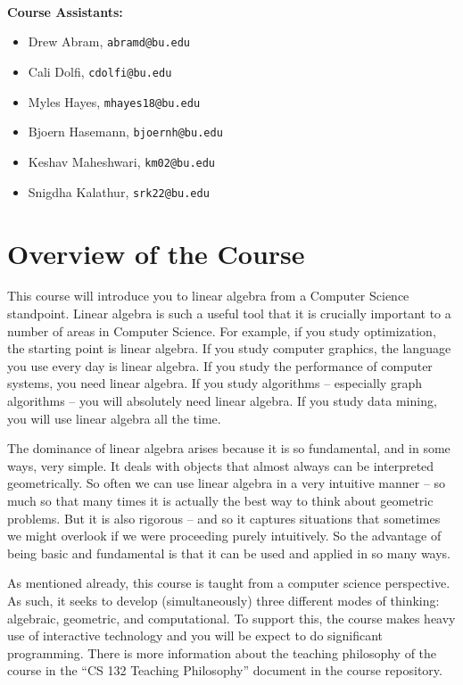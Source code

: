 \documentclass[11pt]{article}
\begin{document}
~\\~\\~\\
\textbf{Course Assistants:}  
\begin{itemize}
\item Drew Abram, \texttt{abramd@bu.edu}
\item Cali Dolfi, \texttt{cdolfi@bu.edu}
\item Myles Hayes, \texttt{mhayes18@bu.edu}
\item Bjoern Hasemann, \texttt{bjoernh@bu.edu}
\item Keshav Maheshwari, \texttt{km02@bu.edu}
\item Snigdha Kalathur, \texttt{srk22@bu.edu}
\end{itemize}

\newpage
\section*{Overview of the Course}

This course will introduce you to linear algebra from a Computer Science
standpoint.  Linear algebra is such a useful tool that it is crucially
important to a number of areas in Computer Science. For example, if you study
optimization, the starting point is linear algebra. If you study
computer graphics, the language you use every day is linear algebra. If
you study the performance of computer systems, you need linear
algebra. If you study algorithms -- especially graph algorithms -- you
will absolutely need linear algebra. If you study data mining, you will
use linear algebra all the time. 

The dominance of linear algebra arises because it is so fundamental, and
in some ways, very simple. It deals with objects that almost always can
be interpreted geometrically. So often we can use linear algebra in a
very intuitive manner -- so much so that many times it is actually the
best way to think about geometric problems. But it is also rigorous --
and so it
captures situations that sometimes we might overlook if we were
proceeding purely intuitively.  So the
advantage of being basic and fundamental is that it can be used and
applied in so many ways. 

As mentioned already, this course is taught from a computer science
perspective.  As such, it 
seeks to develop (simultaneously) three different modes of thinking:
algebraic, geometric, and computational.    To support this, the course
makes heavy use of interactive technology and you will be expect to do
significant programming.    There is more information about the teaching
philosophy of the course in the ``CS 132 Teaching Philosophy'' document
in the course repository.
\end{document}

